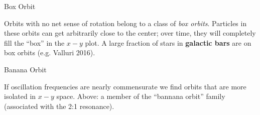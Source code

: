 \documentclass[letterpaper,landscape]{slides}
\begin{document}
\begin{slide}
\begin{center}
{\large \color{red} 
                       Box Orbit }
\end{center}

\begin{center}
\vskip 0.0in
\end{center}

Orbits with no net sense of rotation belong to a class of {\em box orbits}. 
Particles in these orbits can get arbitrarily close to the center; over
time, they will completely fill the ``box'' in the $x-y$ plot.  A large
fraction of stars in {\bf galactic bars} are on box orbits (e.g.  Valluri
2016).

\vfill
\end{slide}

\begin{slide}
\begin{center}
{\large \color{red} 
                       Banana Orbit }
\end{center}

\begin{center}
\vskip 0.0in
\end{center}

If oscillation frequencies are nearly commensurate we find orbits that are
more isolated in $x-y$ space. Above: a member of the ``bannana orbit''
family (associated with the 2:1 resonance).

\vfill
\end{slide}
\end{document}
